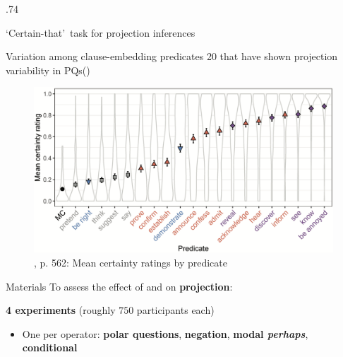 \documentclass[final, table, cmyk]{beamer}
\newlength{\colwidth}
\newlength{\vboxsep}
\begin{document}
\begin{frame}[t]
\begin{columns}[t]
\begin{column}{.74\colwidth}
\begin{normalbox}{\lq Certain-that\rq\ task for projection inferences}
{\begin{minipage}{1.7\linewidth}
					\end{minipage}
				}
				
			\end{normalbox}

			\vspace{\vboxsep}
			\begin{normalbox}{Variation among clause-embedding predicates}
				20  that have shown projection variability in PQs\newline (\citealt{degen_are_2022})

				\begin{figure}[h]
					\centering
					\includegraphics[width=.95\linewidth]{degen-tonhauser.png}
					\vspace{-.8\baselineskip}
					\caption{\citealt{degen_are_2022}, p. 562: Mean certainty ratings by predicate}
					\label{fig:task}
				\end{figure}
				\vspace{-.8\baselineskip}
			\end{normalbox}

			\vspace{\vboxsep}
			\begin{normalbox}{Materials}
				To assess the effect of  and  on \textbf{projection}:
				\vspace{.2\baselineskip}

					\textbf{4 experiments} (roughly $750$ participants each)
					\vspace{-.3\baselineskip}
					\begin{itemize}
						\item One per operator: \textcolor{question}{\bf polar questions}, \textcolor{neg}{\bf negation}, \textcolor{modal}{\bf modal \textit{perhaps}}, \textcolor{cond}{\bf conditional}
					\end{itemize}


\end{normalbox}
\end{column}
\end{columns}
\end{frame}
\end{document}
